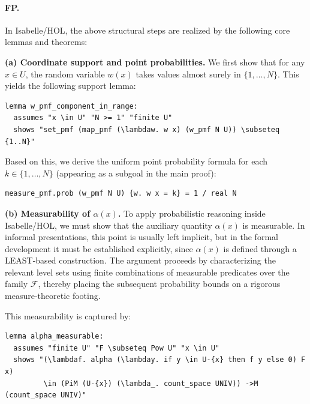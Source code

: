 \paragraph{FP.}

In Isabelle/HOL, the above structural steps are realized by the following core lemmas and theorems:

\medskip

\noindent
\textbf{(a) Coordinate support and point probabilities.}
We first show that for any $x \in U$, the random variable $w(x)$ takes values almost surely in $\{1,\dots,N\}$. This yields the following support lemma:
\listingneedspace
\begin{lstlisting}[language=Isabelle, caption={Coordinate Support}]
lemma w_pmf_component_in_range:
  assumes "x \in U" "N >= 1" "finite U"
  shows "set_pmf (map_pmf (\lambdaw. w x) (w_pmf N U)) \subseteq {1..N}"
\end{lstlisting}


Based on this, we derive the uniform point probability formula for each $k \in \{1,\dots,N\}$ (appearing as a subgoal in the main proof):
\begin{lstlisting}[language=Isabelle, caption={Point Probability of One Coordinate}]
measure_pmf.prob (w_pmf N U) {w. w x = k} = 1 / real N
\end{lstlisting}

\medskip

\noindent
\textbf{(b) Measurability of $\alpha(x)$.}
To apply probabilistic reasoning inside Isabelle/HOL, we must show that the auxiliary quantity $\alpha(x)$ is measurable. 
In informal presentations, this point is usually left implicit, but in the formal development it must be established explicitly, since $\alpha(x)$ is defined through a LEAST-based construction.
The argument proceeds by characterizing the relevant level sets using finite combinations of measurable predicates over the family $\mathcal{F}$, thereby placing the subsequent probability bounds on a rigorous measure-theoretic footing.

This measurability is captured by:
\listingneedspace
\begin{lstlisting}[language=Isabelle, caption={Measurability of Alpha}]
lemma alpha_measurable:
  assumes "finite U" "F \subseteq Pow U" "x \in U"
  shows "(\lambdaf. alpha (\lambday. if y \in U-{x} then f y else 0) F x)
         \in (PiM (U-{x}) (\lambda_. count_space UNIV)) ->M (count_space UNIV)"
\end{lstlisting}


